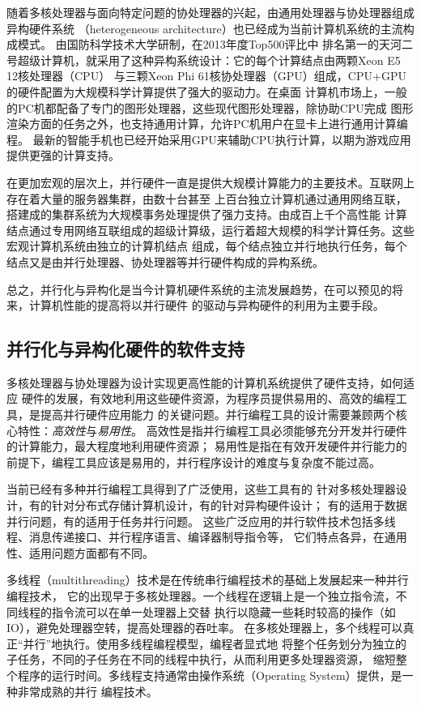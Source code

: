 随着多核处理器与面向特定问题的协处理器的兴起，由通用处理器与协处理器组成异构硬件系统
（heterogeneous architecture）也已经成为当前计算机系统的主流构成模式。
由国防科学技术大学研制，在2013年度Top500评比中
排名第一的天河二号超级计算机，就采用了这种异构系统设计：它的每个计算结点由两颗Xeon E5 12核处理器（CPU）
与三颗Xeon Phi 61核协处理器（GPU）组成，CPU+GPU的硬件配置为大规模科学计算提供了强大的驱动力。在桌面
计算机市场上，一般的PC机都配备了专门的图形处理器，这些现代图形处理器，除协助CPU完成
图形渲染方面的任务之外，也支持通用计算，允许PC机用户在显卡上进行通用计算编程。
最新的智能手机也已经开始采用GPU来辅助CPU执行计算，以期为游戏应用提供更强的计算支持。

在更加宏观的层次上，并行硬件一直是提供大规模计算能力的主要技术。互联网上存在着大量的服务器集群，由数十台甚至
上百台独立计算机通过通用网络互联，搭建成的集群系统为大规模事务处理提供了强力支持。由成百上千个高性能
计算结点通过专用网络互联组成的超级计算级，运行着超大规模的科学计算任务。这些宏观计算机系统由独立的计算机结点
组成，每个结点独立并行地执行任务，每个结点又是由并行处理器、协处理器等并行硬件构成的异构系统。

总之，并行化与异构化是当今计算机硬件系统的主流发展趋势，在可以预见的将来，计算机性能的提高将以并行硬件
的驱动与异构硬件的利用为主要手段。

\subsection{并行化与异构化硬件的软件支持}
多核处理器与协处理器为设计实现更高性能的计算机系统提供了硬件支持，如何适应
硬件的发展，有效地利用这些硬件资源，为程序员提供易用的、高效的编程工具，是提高并行硬件应用能力
的关键问题。并行编程工具的设计需要兼顾两个核心特性：\emph{高效性}与\emph{易用性}。
高效性是指并行编程工具必须能够充分开发并行硬件的计算能力，最大程度地利用硬件资源；
易用性是指在有效开发硬件并行能力的前提下，编程工具应该是易用的，并行程序设计的难度与复杂度不能过高。

当前已经有多种并行编程工具得到了广泛使用，这些工具有的
针对多核处理器设计，有的针对分布式存储计算机设计，有的针对异构硬件设计；
有的适用于数据并行问题，有的适用于任务并行问题。
这些广泛应用的并行软件技术包括多线程、消息传递接口、并行程序语言、编译器制导指令等，
它们特点各异，在通用性、适用问题方面都有不同。

多线程（multithreading）技术是在传统串行编程技术的基础上发展起来一种并行编程技术，
它的出现早于多核处理器。一个线程在逻辑上是一个独立指令流，不同线程的指令流可以在单一处理器上交替
执行以隐藏一些耗时较高的操作（如IO），避免处理器空转，提高处理器的吞吐率。
在多核处理器上，多个线程可以真正“并行”地执行。使用多线程编程模型，编程者显式地
将整个任务划分为独立的子任务，不同的子任务在不同的线程中执行，从而利用更多处理器资源，
缩短整个程序的运行时间。多线程支持通常由操作系统（Operating System）提供，是一种非常成熟的并行
编程技术。%

